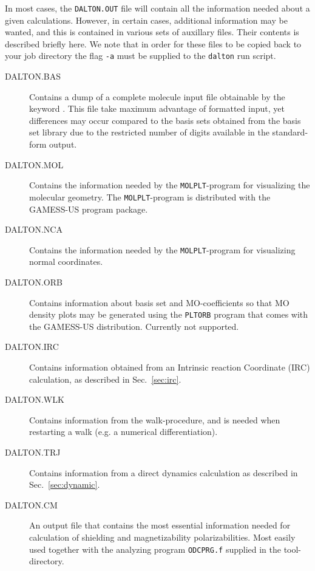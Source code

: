 In most cases, the \verb|DALTON.OUT| file will contain all the
information needed about a given calculations. However, in certain
cases, additional information may be wanted, and this is contained in
various sets of auxillary files. Their contents is described briefly
here. We note that in order for these files to be copied back to your
job directory the flag \verb|-a| must be supplied to the \verb|dalton|
run script.

\begin{description}
\item[DALTON.BAS] Contains a dump of a complete molecule input file
obtainable by the keyword . This file take maximum
advantage of formatted input, yet differences may occur compared to
the basis sets obtained from the basis set library due to the
restricted number of digits available in the standard-form output.

\item[DALTON.MOL] Contains the information needed by the
\verb|MOLPLT|-program for visualizing the molecular geometry. The
\verb|MOLPLT|-program is distributed with the GAMESS-US program
package.

\item[DALTON.NCA] Contains the information needed by the
\verb|MOLPLT|-program for visualizing normal coordinates.

\item[DALTON.ORB] Contains information about basis set and
MO-coefficients so that MO density plots may be generated using the
\verb|PLTORB| program that comes with the GAMESS-US
distribution. Currently not supported.

\item[DALTON.IRC] Contains information obtained from an Intrinsic
reaction Coordinate (IRC) calculation, as described in
Sec.~\ref{sec:irc}.

\item[DALTON.WLK] Contains information from the walk-procedure, and is
needed when restarting a walk (e.g. a numerical differentiation).

\item[DALTON.TRJ] Contains information from a direct dynamics
calculation as described in Sec.~\ref{sec:dynamic}.

\item[DALTON.CM] An output file that contains the most essential
information needed for calculation of shielding and magnetizability
polarizabilities. Most easily used together with the analyzing program
\verb|ODCPRG.f| supplied in the tool-directory.


\end{description}

